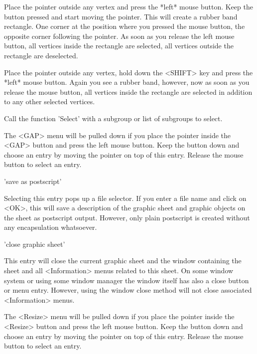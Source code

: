 Place the pointer  outside any vertex  and press the *left* mouse button.
Keep the button pressed and start moving the pointer.  This will create a
rubber band rectangle.  One corner at the position  where you pressed the
mouse button, the opposite corner following  the pointer.  As soon as you
release the left mouse button,   all  vertices inside the rectangle   are
selected, all vertices outside the rectangle are deselected.

Place the pointer outside any vertex, hold down the <SHIFT> key and press
the *left*  mouse button.  Again  you see a rubber  band, however, now as
soon as you release  the mouse button,  all vertices inside the rectangle
are selected in addition to any other selected vertices.

Call   the function 'Select' with   a subgroup or   list  of subgroups to
select.


The <GAP> menu will  be pulled down if  you place the pointer inside  the
<GAP> button  and press the left mouse  button.  Keep the button down and
choose an entry by moving the pointer on  top of this entry.  Release the
mouse button to select an entry.

'save as postscript'

Selecting this entry pops up a file  selector.  If you  enter a file name
and click on <OK>, this will save a  description of the graphic sheet and
graphic objects on  the sheet as postscript  output.  However, only plain
postscript is created without any encapsulation whatsoever.

'close graphic sheet'

This entry will close the current graphic sheet and the window containing
the sheet  and all  <Information> menus related  to  this sheet.  On some
window system or using  some window manager the window  itself has also a
close button or menu entry.  However,  using the window close method will
not close associated <Information> menus.


The <Resize> menu will be pulled down if you place the pointer inside the
<Resize> button and  press the left mouse  button.  Keep  the button down
and choose an entry by moving the pointer on top of  this entry.  Release
the mouse button to select an entry.

